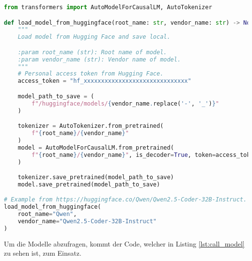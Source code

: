 \begin{lstlisting}[language=python,caption={Laden der Modelle von Hugging Face und lokal speichern},label=lst:download_hugging_face_model]
from transformers import AutoModelForCausalLM, AutoTokenizer

def load_model_from_huggingface(root_name: str, vendor_name: str) -> None:
    """
    Load model from Hugging Face and save local.

    :param root_name (str): Root name of model.
    :param vendor_name (str): Vendor name of model.
    """
    # Personal access token from Hugging Face.
    access_token = "hf_xxxxxxxxxxxxxxxxxxxxxxxxxxxxxx"

    model_path_to_save = (
        f"/huggingface/models/{vendor_name.replace('-', '_')}"
    )

    tokenizer = AutoTokenizer.from_pretrained(
        f"{root_name}/{vendor_name}"
    )
    model = AutoModelForCausalLM.from_pretrained(
        f"{root_name}/{vendor_name}", is_decoder=True, token=access_token
    )

    tokenizer.save_pretrained(model_path_to_save)
    model.save_pretrained(model_path_to_save)

# Example from https://huggingface.co/Qwen/Qwen2.5-Coder-32B-Instruct.
load_model_from_huggingface(
    root_name="Qwen",
    vendor_name="Qwen2.5-Coder-32B-Instruct"
)
\end{lstlisting}

Um die Modelle abzufragen, kommt der Code, welcher in Listing \ref{lst:call_model} zu sehen ist, zum Einsatz.

